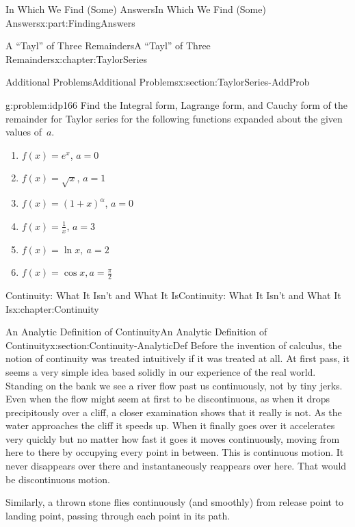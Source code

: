 \documentclass[oneside,10pt,]{book}
\numberwithin{equation}{section}
\begin{document}
\begin{partptx}{In Which We Find (Some) Answers}{}{In Which We Find (Some) Answers}{}{}{x:part:FindingAnswers}
\begin{chapterptx}{A ``Tayl'' of Three Remainders}{}{A ``Tayl'' of Three Remainders}{}{}{x:chapter:TaylorSeries}
\begin{sectionptx}{Additional Problems}{}{Additional Problems}{}{}{x:section:TaylorSeries-AddProb}
\begin{problem}{}{g:problem:idp166}%
Find the Integral form, Lagrange form, and Cauchy form of the remainder for Taylor series for the following functions expanded about the given values of \(\,a\).%
\begin{enumerate}[font=\bfseries,label=(\alph*),ref=\alph*]
\item{}\(f(x)=e^x\), \(a=0\)%
\item{}\(f(x)=\sqrt{x}\), \(a=1\)%
\item{}\(f(x)=(1+x)^\alpha\), \(a=0\)%
\item{}\(f(x)=\frac{1}{x}\), \(a=3\)%
\item{}\(f(x)=\ln x,\ a=2\)%
\item{}\(f(x)=\cos x, a=\frac{\pi}{2}\)%
\end{enumerate}
\end{problem}
\end{sectionptx}
\end{chapterptx}
%
\typeout{************************************************}
\typeout{************************************************}
%
\begin{chapterptx}{Continuity: What It Isn't and What It Is}{}{Continuity: What It Isn't and What It Is}{}{}{x:chapter:Continuity}
%
%
\typeout{************************************************}
\typeout{************************************************}
%
\begin{sectionptx}{An Analytic Definition of Continuity}{}{An Analytic Definition of Continuity}{}{}{x:section:Continuity-AnalyticDef}
Before the invention of calculus, the notion of continuity was treated intuitively if it was treated at all.  At first pass, it seems a very simple idea based solidly in our experience of the real world.  Standing on the bank we see a river flow past us continuously, not by tiny jerks.  Even when the flow might seem at first to be discontinuous, as when it drops precipitously over a cliff, a closer examination shows that it really is not. As the water approaches the cliff it speeds up.  When it finally goes over it accelerates very quickly but no matter how fast it goes it moves continuously, moving from here to there by occupying every point in between.  This is continuous motion. It never disappears over there and instantaneously reappears over here.  That would be discontinuous motion.%
\par
Similarly, a thrown stone flies continuously (and smoothly) from release point to landing point, passing through each point in its path.%

\end{sectionptx}
\end{chapterptx}
\end{partptx}
\end{document}
